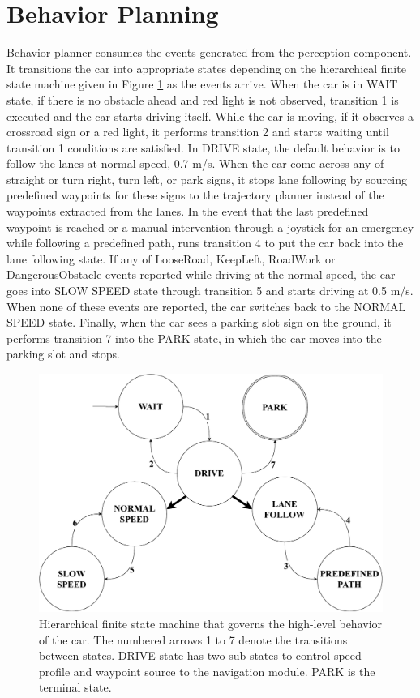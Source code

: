 \section{Behavior Planning}

Behavior planner consumes the events generated from the perception component.
It transitions the car into appropriate states depending on the hierarchical
finite state machine given in Figure \ref{figure:hfsm} as the events arrive.
When the car is in WAIT state, if there is no obstacle ahead and red light is
not observed, transition 1 is executed and the car starts driving itself. While
the car is moving, if it observes a crossroad sign or a red light, it performs
transition 2 and starts waiting until transition 1 conditions are satisfied. In
DRIVE state, the default behavior is to follow the lanes at normal speed, 0.7
m/s. When the car come across any of straight or turn right, turn left, or park
signs, it stops lane following by sourcing predefined waypoints for these signs
to the trajectory planner instead of the waypoints extracted from the lanes. In
the event that the last predefined waypoint is reached or a manual intervention
through a joystick for an emergency while following a predefined path, runs
transition 4 to put the car back into the lane following state. If any of
LooseRoad, KeepLeft, RoadWork or DangerousObstacle events reported while
driving at the normal speed, the car goes into SLOW SPEED state through
transition 5 and starts driving at 0.5 m/s. When none of these events are
reported, the car switches back to the NORMAL SPEED state. Finally, when the
car sees a parking slot sign on the ground, it performs transition 7 into the
PARK state, in which the car moves into the parking slot and stops.

\begin{figure}[h]
\centering
\includegraphics[width=.8\textwidth]{figures/hfsm.pdf}
\caption{Hierarchical finite state machine that governs the high-level behavior
of the car. The numbered arrows 1 to 7 denote the transitions between states.
DRIVE state has two sub-states to control speed profile and waypoint source to
the navigation module. PARK is the terminal state.}
\label{figure:hfsm}
\end{figure}
